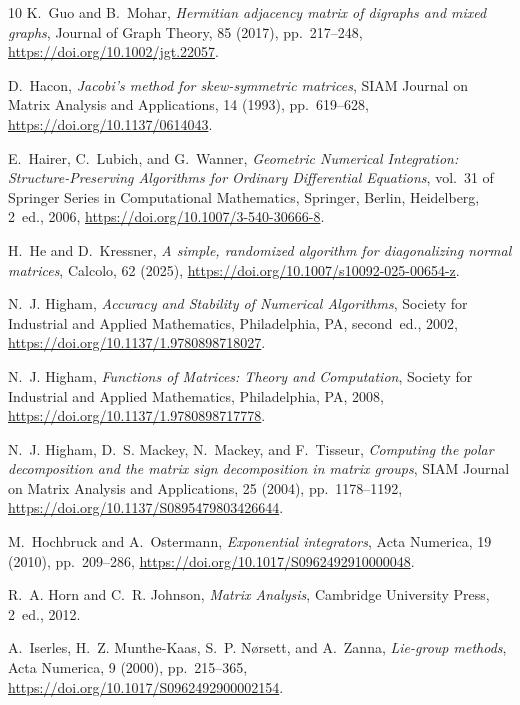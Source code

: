 \documentclass[final,onefignum,onetabnum,dvipsnames]{siamart251216}
\numberwithin{algorithm}{section}
\numberwithin{equation}{section}
\begin{document}
\begin{thebibliography}{10}
{\sc K.~Guo and B.~Mohar}, {\em Hermitian adjacency matrix of digraphs and mixed graphs}, Journal of Graph Theory, 85 (2017), pp.~217--248, \url{https://doi.org/10.1002/jgt.22057}.

{\sc D.~Hacon}, {\em Jacobi's method for skew-symmetric matrices}, SIAM Journal on Matrix Analysis and Applications, 14 (1993), pp.~619--628, \url{https://doi.org/10.1137/0614043}.

{\sc E.~Hairer, C.~Lubich, and G.~Wanner}, {\em Geometric Numerical Integration: Structure-Preserving Algorithms for Ordinary Differential Equations}, vol.~31 of Springer Series in Computational Mathematics, Springer, Berlin, Heidelberg, 2~ed., 2006, \url{https://doi.org/10.1007/3-540-30666-8}.

{\sc H.~He and D.~Kressner}, {\em A simple, randomized algorithm for diagonalizing normal matrices}, Calcolo, 62 (2025), \url{https://doi.org/10.1007/s10092-025-00654-z}.

{\sc N.~J. Higham}, {\em Accuracy and Stability of Numerical Algorithms}, Society for Industrial and Applied Mathematics, Philadelphia, PA, second~ed., 2002, \url{https://doi.org/10.1137/1.9780898718027}.

{\sc N.~J. Higham}, {\em Functions of Matrices: Theory and Computation}, Society for Industrial and Applied Mathematics, Philadelphia, PA, 2008, \url{https://doi.org/10.1137/1.9780898717778}.

{\sc N.~J. Higham, D.~S. Mackey, N.~Mackey, and F.~Tisseur}, {\em Computing the polar decomposition and the matrix sign decomposition in matrix groups}, SIAM Journal on Matrix Analysis and Applications, 25 (2004), pp.~1178--1192, \url{https://doi.org/10.1137/S0895479803426644}.

{\sc M.~Hochbruck and A.~Ostermann}, {\em Exponential integrators}, Acta Numerica, 19 (2010), pp.~209--286, \url{https://doi.org/10.1017/S0962492910000048}.

{\sc R.~A. Horn and C.~R. Johnson}, {\em Matrix Analysis}, Cambridge University Press, 2~ed., 2012.

{\sc A.~Iserles, H.~Z. Munthe-Kaas, S.~P. N{\o}rsett, and A.~Zanna}, {\em Lie-group methods}, Acta Numerica, 9 (2000), pp.~215--365, \url{https://doi.org/10.1017/S0962492900002154}.


\end{thebibliography}
\end{document}
